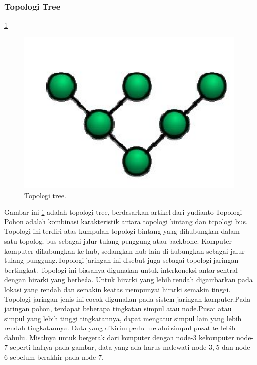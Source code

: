   \subsubsection{Topologi Tree}
    \ref{tree}
    \begin{figure}[ht]
    \centerline{\includegraphics[width=1\textwidth]{figures/tree.JPG}}
    \caption{Topologi tree.}
    \label{tree}
    \end{figure}
    Gambar ini \ref{tree} adalah topologi tree, berdasarkan artikel dari yudianto Topologi Pohon adalah kombinasi karakteristik antara topologi bintang dan topologi bus\cite{yudianto2007jaringan}. Topologi ini terdiri atas kumpulan topologi bintang yang dihubungkan dalam satu topologi bus sebagai jalur tulang punggung atau backbone. Komputer-komputer dihubungkan ke hub, sedangkan hub lain di hubungkan sebagai jalur tulang punggung.Topologi jaringan ini disebut juga sebagai topologi jaringan bertingkat. Topologi ini biasanya digunakan untuk interkoneksi antar sentral dengan hirarki yang berbeda. Untuk hirarki yang lebih rendah digambarkan pada lokasi yang rendah dan semakin keatas mempunyai hirarki semakin tinggi. Topologi jaringan jenis ini cocok digunakan pada sistem jaringan komputer.Pada jaringan pohon, terdapat beberapa tingkatan simpul atau node.Pusat atau simpul yang lebih tinggi tingkatannya, dapat mengatur simpul lain yang lebih rendah tingkatannya. Data yang dikirim perlu melalui simpul pusat terlebih dahulu. Misalnya untuk bergerak dari komputer dengan node-3 kekomputer node-7 seperti halnya pada gambar, data yang ada harus melewati node-3, 5 dan node-6 sebelum berakhir pada node-7.
